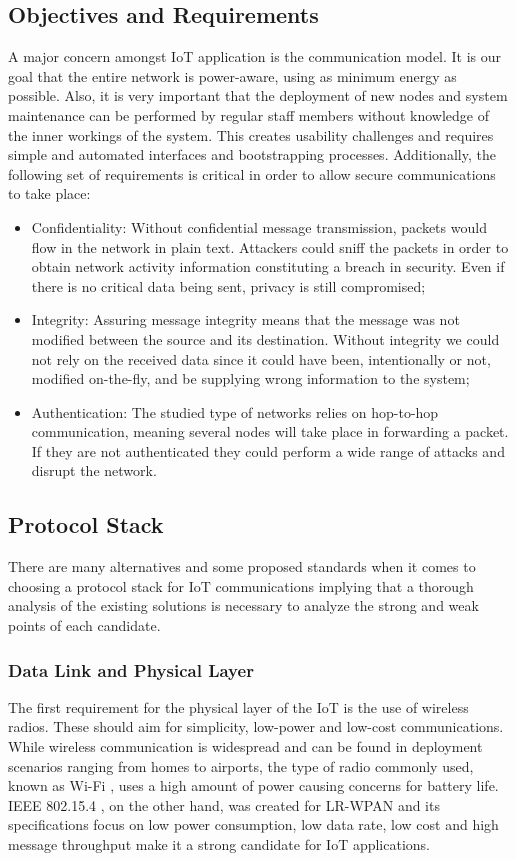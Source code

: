 \documentclass{sig-alternate-05-2015}
\begin{document}
\subsection{Objectives and Requirements}
A major concern amongst \gls{IoT} application is the communication model. 
It is our goal that the entire network is power-aware, using as minimum energy as possible.
Also, it is very important that the deployment of new nodes and system maintenance can be performed by regular staff members without knowledge of the inner workings of the system.
This creates usability challenges and requires simple and automated interfaces and bootstrapping processes. 
Additionally, the following set of requirements is critical in order to allow secure communications to take place:
\begin{itemize}
	\item Confidentiality: Without confidential message transmission, packets would flow in the network in plain text. 
	Attackers could sniff the packets in order to obtain network activity information constituting a breach in security. 
	Even if there is no critical data being sent, privacy is still compromised;
	\item Integrity: Assuring message integrity means that the message was not modified between the source and its destination. 
	Without integrity we could not rely on the received data since it could have been, intentionally or not, modified on-the-fly, and be supplying wrong information to the system;
	\item Authentication: The studied type of networks relies on hop-to-hop communication, meaning several nodes will take place in forwarding a packet. 
	If they are not authenticated they could perform a wide range of attacks and disrupt the network.
\end{itemize}

\subsection{Protocol Stack}
\label{sec:protocol_stack}
There are many alternatives and some proposed standards when it comes to choosing a protocol stack for \gls{IoT} communications \cite{Al-Fuqaha2015} implying that a thorough analysis of the existing solutions is necessary to analyze the strong and weak points of each candidate.   

\subsubsection{Data Link and Physical Layer}
\label{sec:data_link}
The first requirement for the physical layer of the \gls{IoT} is the use of wireless radios. These should aim for simplicity, low-power and low-cost communications. While wireless communication is widespread and can be found in deployment scenarios ranging from homes to airports, the type of radio commonly used, known as Wi-Fi \cite{IEEE2012}, uses a high amount of power causing concerns for battery life. IEEE 802.15.4 \cite{IEEEComputerSociety2011}, on the other hand, was created for \gls{LR-WPAN} and its specifications focus on low power consumption, low data rate, low cost and high message throughput make it a strong candidate for \gls{IoT} applications.
\end{document}

